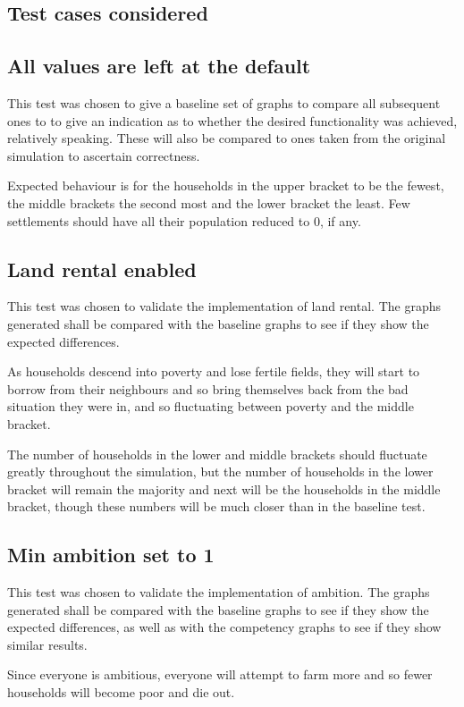 \documentclass[12pt]{article}
\begin{document}
		
		\subsection{Test cases considered}
			\subsection{All values are left at the default}
				This test was chosen to give a baseline set of graphs to compare all subsequent ones to to give an indication as to whether the desired functionality was achieved, relatively speaking. These will also be compared to ones taken from the original simulation to ascertain correctness.
			
				Expected behaviour is for the households in the upper bracket to be the fewest, the middle brackets the second most and the lower bracket the least. Few settlements should have all their population reduced to 0, if any. 
		
			\subsection{Land rental enabled}
				This test was chosen to validate the implementation of land rental. The graphs generated shall be compared with the baseline graphs to see if they show the expected differences.
		
				As households descend into poverty and lose fertile fields, they will start to borrow from their neighbours and so bring themselves back from the bad situation they were in, and so fluctuating between poverty and the middle bracket.
		
				The number of households in the lower and middle brackets should fluctuate greatly throughout the simulation, but the number of households in the lower bracket will remain the majority and next will be the households in the middle bracket, though these numbers will be much closer than in the baseline test. 
		
		
			\subsection{Min ambition set to 1}
				This test was chosen to validate the implementation of ambition. The graphs generated shall be compared with the baseline graphs to see if they show the expected differences, as well as with the competency graphs to see if they show similar results.
		
				Since everyone is ambitious, everyone will attempt to farm more and so fewer households will become poor and die out.
		
\end{document}
